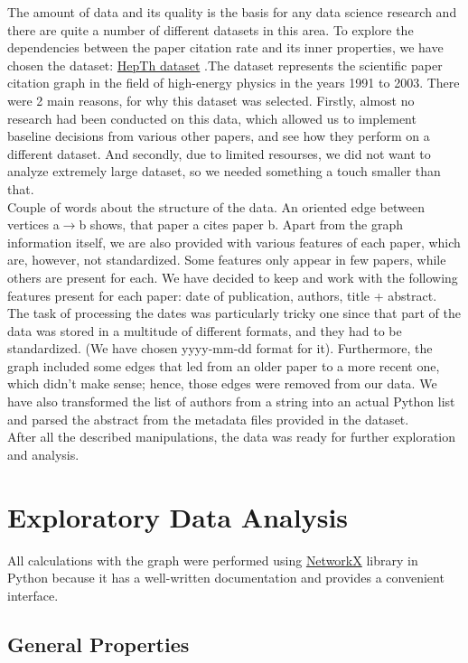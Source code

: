 \documentclass{article}
\newcommand\tab[1][1cm]{\hspace*{#1}}
\begin{document}
\tab	The amount of data and its quality is the basis for any data science research and there are quite a number of different datasets in this area. To explore the dependencies between the paper citation rate and its inner properties, we have chosen the dataset: \href{https://www.kaggle.com/datasets/wolfram77/graphs-snap-cit}{HepTh dataset} .The dataset represents the scientific paper citation graph in the field of high-energy physics in the years 1991 to 2003. There were 2 main reasons, for why this dataset was selected. Firstly, almost no research had been conducted on this data, which allowed us to implement baseline decisions from various other papers, and see how they perform on a different dataset. And secondly, due to limited resourses, we did not want to analyze extremely large dataset, so we needed something a touch smaller than that. \\
\tab	 Couple of words about the structure of the data. An oriented edge between vertices a$\rightarrow$b shows, that paper a cites paper b. Apart from the graph information itself, we are also provided with various features of each paper, which are, however, not standardized. Some features only appear in few papers, while others are present for each. We have decided to keep and work with the following features present for each paper: date of publication, authors, title + abstract. \\
\tab	The task of processing the dates was particularly tricky one since that part of the data was stored in a multitude of different formats, and they had to be standardized. (We have chosen yyyy-mm-dd format for it). Furthermore, the graph included some edges that led from an older paper to a more recent one, which didn't make sense; hence, those edges were removed from our data. We have also transformed the list of authors from a string into an actual Python list and parsed the abstract from the metadata files provided in the dataset. \\
\tab	After all the described manipulations, the data was ready for further exploration and analysis. \\

\section{Exploratory Data Analysis}
\tab All calculations with the graph were performed using \href{https://networkx.org/}{NetworkX} library in Python because it has a well-written documentation and provides a convenient interface.
\subsection{General Properties}
\end{document}
